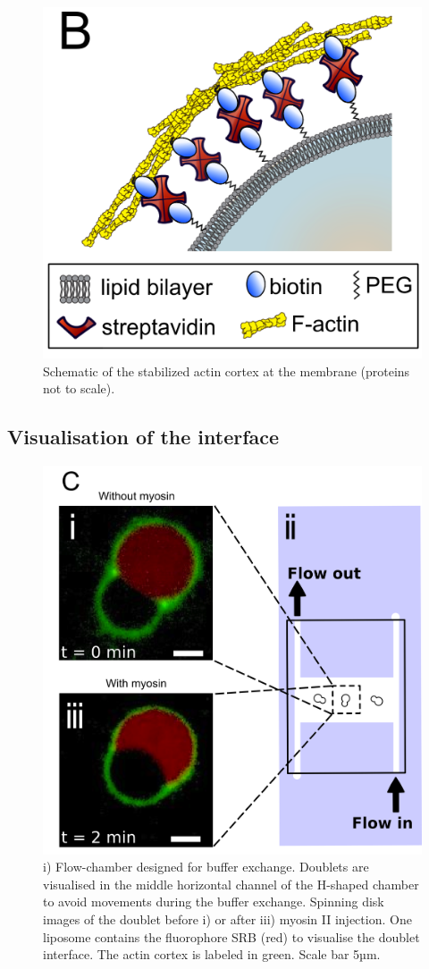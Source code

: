 \documentclass[A4paperpaper,11pt,english]{sphinxmanual}
\begin{document}
\begin{figure}[htbp]
\centering
\capstart

\includegraphics[width=0.500\linewidth]{Fig_01-B.png}
\caption{Schematic of the stabilized actin cortex at the membrane (proteins not to scale).}\label{parts/part4:fig1b}\end{figure}


\subsection{Visualisation of the interface}
\label{parts/part4:visualisation-of-the-interface}\begin{figure}[htbp]
\centering
\capstart

\includegraphics[width=0.500\linewidth]{Fig_01-C.png}
\caption{i) Flow-chamber designed for buffer exchange. Doublets
are visualised in the middle horizontal channel of the H-shaped chamber to
avoid movements during the buffer exchange. Spinning disk images of the
doublet before i) or after iii) myosin II injection. One liposome contains the fluorophore
SRB (red) to visualise the doublet interface. The actin cortex is
labeled in green. Scale bar 5µm.}\label{parts/part4:fig1c}\end{figure}
\end{document}
